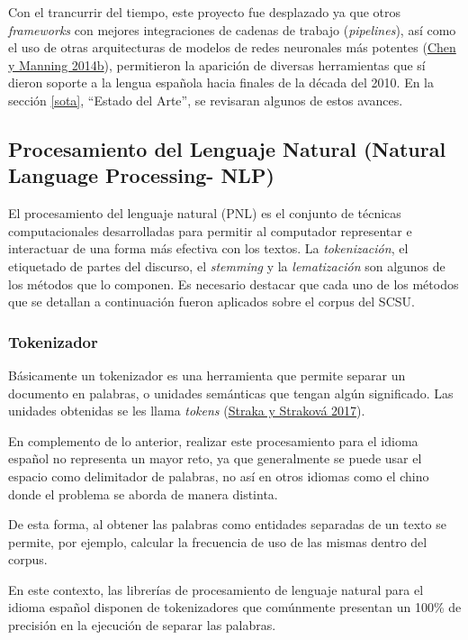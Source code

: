 \documentclass[
  12pt,
  openany]{book}
\begin{document}
Con el trancurrir del tiempo, este proyecto fue desplazado ya que otros \emph{frameworks} con mejores integraciones de cadenas de trabajo (\emph{pipelines}), así como el uso de otras arquitecturas de modelos de redes neuronales más potentes (\protect\hyperlink{ref-chen2014fast}{Chen y Manning 2014b}), permitieron la aparición de diversas herramientas que sí dieron soporte a la lengua española hacia finales de la década del 2010. En la sección \ref{sota}, ``Estado del Arte'', se revisaran algunos de estos avances.

\hypertarget{nlproc}{%
\subsection{Procesamiento del Lenguaje Natural (Natural Language Processing- NLP)}\label{nlproc}}

El procesamiento del lenguaje natural (PNL) es el conjunto de técnicas computacionales desarrolladas para permitir al computador representar e interactuar de una forma más efectiva con los textos. La \emph{tokenización}, el etiquetado de partes del discurso, el \emph{stemming} y la \emph{lematización} son algunos de los métodos que lo componen. Es necesario destacar que cada uno de los métodos que se detallan a continuación fueron aplicados sobre el corpus del SCSU.

\hypertarget{token}{%
\subsubsection{Tokenizador}\label{token}}

Básicamente un tokenizador es una herramienta que permite separar un documento en palabras, o unidades semánticas que tengan algún significado. Las unidades obtenidas se les llama \emph{tokens} (\protect\hyperlink{ref-straka2017}{Straka y Straková 2017}).

En complemento de lo anterior, realizar este procesamiento para el idioma español no representa un mayor reto, ya que generalmente se puede usar el espacio como delimitador de palabras, no así en otros idiomas como el chino donde el problema se aborda de manera distinta.

De esta forma, al obtener las palabras como entidades separadas de un texto se permite, por ejemplo, calcular la frecuencia de uso de las mismas dentro del corpus.

En este contexto, las librerías de procesamiento de lenguaje natural para el idioma español disponen de tokenizadores que comúnmente presentan un 100\% de precisión en la ejecución de separar las palabras.
\end{document}
